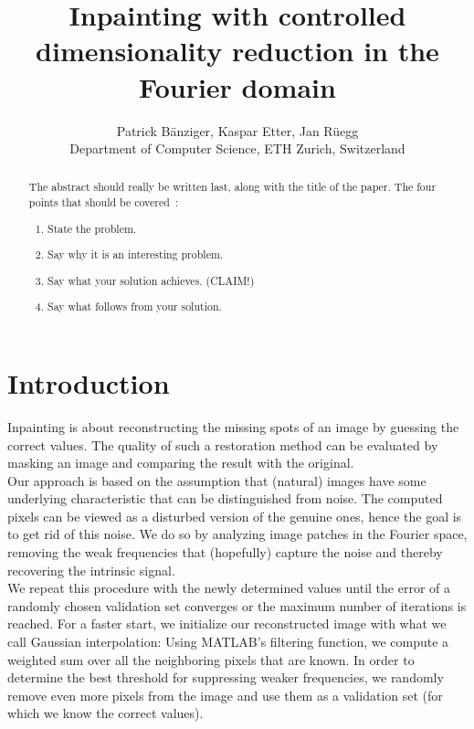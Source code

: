 \documentclass[10pt,conference,compsocconf]{IEEEtran}
\begin{document}
\title{Inpainting with controlled dimensionality reduction in the Fourier domain}

\author{
  Patrick Bänziger, Kaspar Etter, Jan Rüegg\\
  Department of Computer Science, ETH Zurich, Switzerland
}

\maketitle

\begin{abstract}
The abstract should really be written last, along with the title of
the paper. The four points that should be covered~\cite{jones08}:
\begin{enumerate}
\item State the problem.
\item Say why it is an interesting problem.
\item Say what your solution achieves. (CLAIM!)
\item Say what follows from your solution.
\end{enumerate}
\end{abstract}

\section{Introduction}
Inpainting is about reconstructing the missing spots of an image by guessing the correct values. The quality of such a restoration method can be evaluated by masking an image and comparing the result with the original.\\
Our approach is based on the assumption that (natural) images have some underlying characteristic that can be distinguished from noise. The computed pixels can be viewed as a disturbed version of the genuine ones, hence the goal is to get rid of this noise. We do so by analyzing image patches in the Fourier space, removing the weak frequencies that (hopefully) capture the noise and thereby recovering the intrinsic signal.\\
We repeat this procedure with the newly determined values until the error of a randomly chosen validation set converges or the maximum number of iterations is reached. For a faster start, we initialize our reconstructed image with what we call Gaussian interpolation: Using MATLAB's filtering function, we compute a weighted sum over all the neighboring pixels that are known. In order to determine the best threshold for suppressing weaker frequencies, we randomly remove even more pixels from the image and use them as a validation set (for which we know the correct values).
\end{document}
